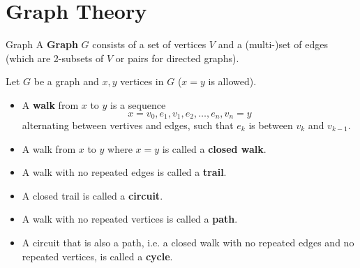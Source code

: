 \documentclass[english]{lbscript}
\begin{document}
\section{Graph Theory}
\label{sec:graph-theory}

\begin{definition}{Graph}{}
A \textbf{Graph} \(G\) consists of a set of vertices \(V\) and a (multi-)set of edges (which are 2-subsets of \(V\) or pairs for directed graphs).
\end{definition}

\begin{definition}{}{}
  Let \(G\) be a graph and \(x, y\) vertices in \(G\) (\(x=y\) is allowed).
  \begin{itemize}
  \item A \textbf{walk} from \(x\) to \(y\) is a sequence
\begin{equation}
\label{eq:94}
x= v_0,e_1,v_1,e_2,\dots, e_n, v_n=y
\end{equation}
alternating between vertives and edges, such that \(e_k\) is between \(v_k\) and \(v_{k-1}\).
\item A walk from \(x\) to \(y\) where \(x=y\) is called a \textbf{closed walk}.
\item A walk with no repeated edges is called a \textbf{trail}.
\item A closed trail is called a \textbf{circuit}.
\item A walk with no repeated vertices is called a \textbf{path}.
\item A circuit that is also a path, i.e. a closed walk with no repeated edges and no repeated vertices, is called a \textbf{cycle}.
  \end{itemize}

\end{definition}


\end{document}
